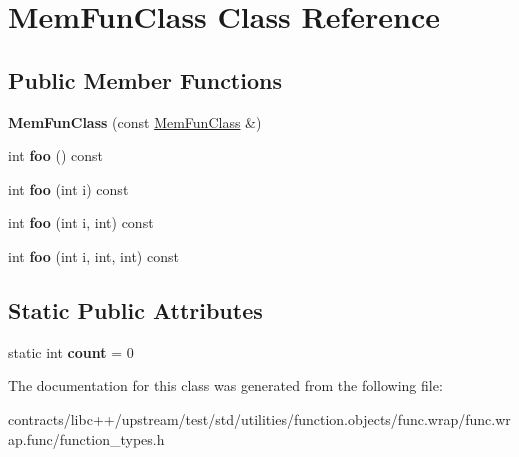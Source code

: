\hypertarget{class_mem_fun_class}{}\section{Mem\+Fun\+Class Class Reference}
\label{class_mem_fun_class}
\subsection*{Public Member Functions}
\begin{DoxyCompactItemize}
\item 
\mbox{\label{class_mem_fun_class_ab93e7ac2ec256d9fac0713c53a03bff1}} 
{\bfseries Mem\+Fun\+Class} (const \mbox{\hyperlink{class_mem_fun_class}{Mem\+Fun\+Class}} \&)
\item 
\mbox{\label{class_mem_fun_class_af1a90c3e9a40749fc22c13c1dc053a36}} 
int {\bfseries foo} () const
\item 
\mbox{\label{class_mem_fun_class_aa0abea6485875d9cf6baafdc7c74a132}} 
int {\bfseries foo} (int i) const
\item 
\mbox{\label{class_mem_fun_class_ac1d2316f24614a66af1ae6e41d70b24c}} 
int {\bfseries foo} (int i, int) const
\item 
\mbox{\label{class_mem_fun_class_a4a9193d517198fea46889003c1e7d2d9}} 
int {\bfseries foo} (int i, int, int) const
\end{DoxyCompactItemize}
\subsection*{Static Public Attributes}
\begin{DoxyCompactItemize}
\item 
\mbox{\label{class_mem_fun_class_a95fee4b21e30db4bf01a3a04ea39a3bf}} 
static int {\bfseries count} = 0
\end{DoxyCompactItemize}


The documentation for this class was generated from the following file\+:\begin{DoxyCompactItemize}
\item 
contracts/libc++/upstream/test/std/utilities/function.\+objects/func.\+wrap/func.\+wrap.\+func/function\+\_\+types.\+h\end{DoxyCompactItemize}
